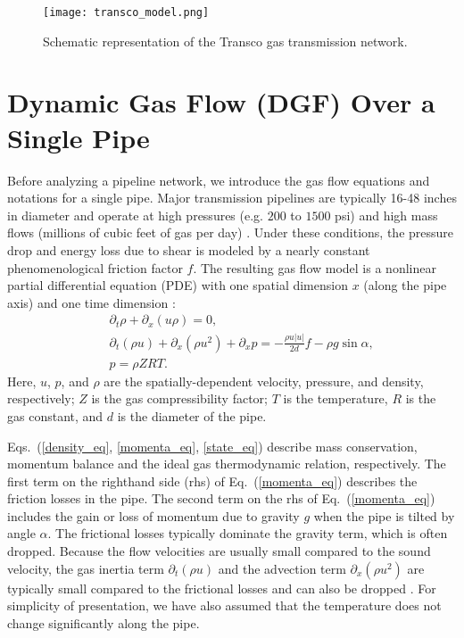 \documentclass[10pt, conference, compsocconf]{IEEEtran}
\begin{document}
 \begin{figure}
\centering
\texttt{[image: transco\_model.png]}
\caption{Schematic representation of the Transco gas transmission network.}
\label{fig:Transco}
\end{figure}

\section{Dynamic Gas Flow (DGF) Over a Single Pipe}
\label{sec:TI}


Before analyzing a pipeline network, we introduce the gas flow equations and notations for a single pipe. Major transmission pipelines are typically 16-48 inches in diameter and operate at high pressures (e.g. $200$ to $1500$ psi) and high mass flows (millions of cubic feet of gas per day) \cite{Ref_Crane1982,Ref_Mokhatab2006}. Under these conditions, the pressure drop and energy loss due to shear is modeled by a nearly constant phenomenological friction factor $f$.  The resulting gas flow model is a nonlinear partial differential equation (PDE) with one spatial dimension $x$ (along the pipe axis) and one time dimension \cite{osiadacz1987simulation,87TT,05Sar}:
\begin{eqnarray}
&& \partial_t\rho+\partial_x (u\rho)=0,\label{density_eq}\\
&& \partial_t (\rho u)+\partial_x (\rho u^2)+\partial_x p=-\frac{\rho u |u|}{2d} f-\rho g \sin\alpha,\label{momenta_eq}\\
&& p=\rho Z R T.\label{thermodynamic_eq}
\label{state_eq}
\end{eqnarray}
Here, $u$, $p$, and $\rho$ are the spatially-dependent velocity, pressure, and density, respectively; $Z$ is the gas compressibility factor; $T$ is the temperature, $R$ is the gas constant, and $d$ is the diameter of the pipe.

Eqs.~(\ref{density_eq}, \ref{momenta_eq}, \ref{state_eq}) describe mass conservation, momentum balance and the ideal gas thermodynamic relation, respectively. The first term on the righthand side (rhs) of Eq.~(\ref{momenta_eq}) describes the friction losses in the pipe. The second term on the rhs of Eq.~(\ref{momenta_eq}) includes the gain or loss of momentum due to gravity $g$ when the pipe is tilted by angle $\alpha$.  The frictional losses typically dominate the gravity term, which is often dropped.  Because the flow velocities are usually small compared to the sound velocity, the gas inertia term $\partial_t(\rho u)$ and the advection term $\partial_x(\rho u^2)$ are typically small compared to the frictional losses and can also be dropped \cite{osiadacz1987simulation,87TT,05Sar}. For simplicity of presentation, we have also assumed that the temperature does not change significantly along the pipe.
\end{document}
